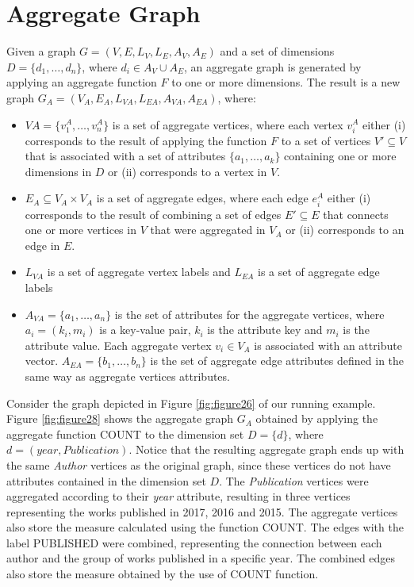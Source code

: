 \section{Aggregate Graph}
Given a graph $G = (V, E, L_V, L_E, A_V, A_E)$ and a set of dimensions $D = \{d_1, \dots, d_n\}$, where $d_i \in A_V \cup A_E$, an aggregate graph is generated by applying an aggregate function $F$ to one or more dimensions. The result is a new graph $G_A = (V_A, E_A, L_{VA}, L_{EA}, A_{VA}, A_{EA})$, where:
\begin{itemize}
\item $VA = \{v^A_1, \dots, v^A_n\}$ is a set of aggregate vertices, where each vertex $v^A_i$ either (i) corresponds to the result of applying the function $F$ to a set of vertices $V' \subseteq V$ that is associated with a set of attributes $\{a_1, \dots, a_k\}$ containing one or more dimensions in $D$ or (ii) corresponds to a vertex in $V$.
\item $E_A \subseteq V_A \times V_A$ is a set of aggregate edges, where each edge $e^A_i$ either (i) corresponds to the result of combining a set of edges $E' \subseteq E$ that connects one or more vertices in $V$ that were aggregated in $V_A$ or (ii) corresponds to an edge in $E$.
\item $L_{VA}$ is a set of aggregate vertex labels and $L_{EA}$ is a set of aggregate edge labels
\item $A_{VA} = \{a_1, \dots, a_n\}$ is the set of attributes for the aggregate vertices, where $a_i = (k_i, m_i)$ is a key-value pair, $k_i$ is the attribute key and $m_i$ is the attribute value. Each aggregate vertex $v_i \in V_A$ is associated with an attribute vector. $A_{EA} = \{b_1, \dots, b_n\}$ is the set of aggregate edge attributes defined in the same way as aggregate vertices attributes.
\end{itemize}

Consider the graph depicted in Figure \ref{fig:figure26} of our running example. Figure \ref{fig:figure28} shows the aggregate graph $G_A$ obtained by applying the aggregate function COUNT to the dimension set $D = \{d\}$, where $d = (year, Publication)$. Notice that the resulting aggregate graph ends up with the same \emph{Author} vertices as the original graph, since these vertices do not have attributes contained in the dimension set $D$. The \emph{Publication} vertices were aggregated according to their \emph{year} attribute, resulting in three vertices representing the works published in 2017, 2016 and 2015. The aggregate vertices also store the measure calculated using the function COUNT. The edges with the label PUBLISHED were combined, representing the connection between each author and the group of works published in a specific year. The combined edges also store the measure obtained by the use of COUNT function.


